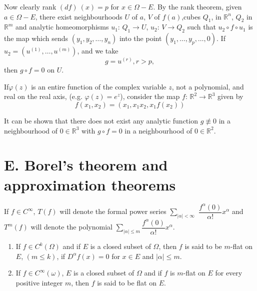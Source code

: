 Now clearly rank $(df) ~ (x) = p $ for $x \in \Omega -E$. By the rank
theorem, given $a \in \Omega - E$, there exist neighbourhoods $U$ of
$a$, $V$ of $f(a)$,cubes $Q_1$, in $\mathbb{R}^n$, $Q_2$ in 
$\mathbb{R}^m$ and analytic homeomorphisms $u_1$: $Q_1 \to U$, $u_2$: $V
\to Q_2$ such that $u_2  \circ f \circ u_1$  is the map which sends $(y_1,
y_2, \ldots , y_n)$ into the point $(y_1, \ldots , y_p , \ldots ,
0)$. If $u_2 = (u^{(1)} , \ldots , u^{(m)})$, and we take  
$$
g = u ^{(r)}, r > p,
$$
then $ g \circ f = 0 $ on $U$.
 
\begin{example*}%
  If\pageoriginale $\varphi (z)$ is an entire function of the complex variable $z$,
  not a polynomial, and real on the real axis, (e.g. $\varphi (z) =
  e^z$), consider the map $f$: $\mathbb{R}^2 \to \mathbb{R}^3$ given
  by  
  $$
  f (x_1, x_2) = (x_1, x_1 x_2, x_1 f (x_2))
  $$

  It can be shown that there does not exist any analytic function $g
  \not \equiv 0$ in a neighbourhood  of $0 \in \mathbb{R}^3$ with $g \circ
  f = 0$ in a neighbourhood of $0 \in \mathbb{R}^2$.  
\end{example*}

\section{E. Borel's theorem and approximation theorems}\label{chap1:sec5}%
 
\begin{notation}
  If $f \in C^\infty$, $T(f)$ will denote the formal power series
  $\sum\limits_{ | \alpha | < \infty}$ $\dfrac{f^\alpha (0)}{\alpha !}
  x^\alpha$ and $T^m(f)$ will denote the polynomial $\sum\limits_{ |
    \alpha | \leq m } \dfrac{f ^\alpha (0)}{\alpha !} x ^\alpha$.  
\end{notation}

\begin{defis*}%
  \begin{enumerate}[(1)]
  \item If  $f \in C^k (\Omega )$ and if $E$ is a closed subset of
    $\Omega$, then $f$ is said to be $m$-flat on $E$, $(m \leq k)$, if
    $D^\alpha f(x) = 0$ for $x \in E$ and $|\alpha| \leq m$. 
  \item If $f \in C^\infty(\omega)$, $E$  is a closed subset of $\Omega$ and
    if $f$ is  $m$-flat on $E$ for every positive integer $m$, then
    $f$ is said to be flat on $E$. 
  \end{enumerate}
\end{defis*}

